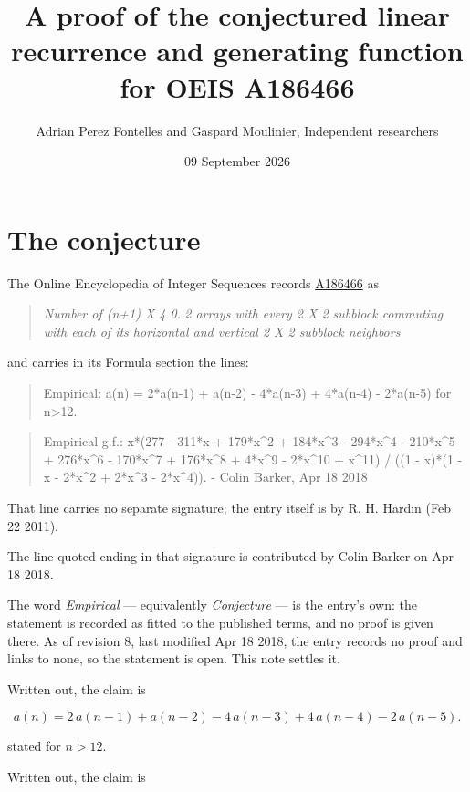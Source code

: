 \documentclass[11pt]{article}
\title{A proof of the conjectured linear recurrence and generating function for OEIS A186466}
\author{Adrian Perez Fontelles and Gaspard Moulinier, Independent researchers}
\date{09 September 2026}
\theoremstyle{definition}
\begin{document}
\maketitle
\section{The conjecture}

The Online Encyclopedia of Integer Sequences records \href{https://oeis.org/A186466}{A186466} as

\begin{quote}\itshape Number of (n+1) X 4 0..2 arrays with every 2 X 2 subblock commuting with each of its horizontal and vertical 2 X 2 subblock neighbors\end{quote}

and carries in its Formula section the lines:

\begin{quote}\ttfamily Empirical: a(n) = 2*a(n-1) + a(n-2) - 4*a(n-3) + 4*a(n-4) - 2*a(n-5) for n>12.\end{quote}

\begin{quote}\ttfamily Empirical g.f.: x*(277 - 311*x + 179*x\textasciicircum{}2 + 184*x\textasciicircum{}3 - 294*x\textasciicircum{}4 - 210*x\textasciicircum{}5 + 276*x\textasciicircum{}6 - 170*x\textasciicircum{}7 + 176*x\textasciicircum{}8 + 4*x\textasciicircum{}9 - 2*x\textasciicircum{}10 + x\textasciicircum{}11) / ((1 - x)*(1 - x - 2*x\textasciicircum{}2 + 2*x\textasciicircum{}3 - 2*x\textasciicircum{}4)). - Colin Barker, Apr 18 2018\end{quote}

That line carries no separate signature; the entry itself is by R. H. Hardin (Feb 22 2011).

The line quoted ending in that signature is contributed by Colin Barker on Apr 18 2018.

The word {\itshape Empirical} --- equivalently {\itshape Conjecture} --- is the entry's own: the statement is recorded as fitted to the published terms, and no proof is given there. As of revision 8, last modified Apr 18 2018, the entry records no proof and links to none, so the statement is open. This note settles it.

Written out, the claim is

\[a(n) = 2\,a(n-1) + a(n-2) - 4\,a(n-3) + 4\,a(n-4) - 2\,a(n-5).\]

stated for $n > 12$.

Written out, the claim is
\end{document}
